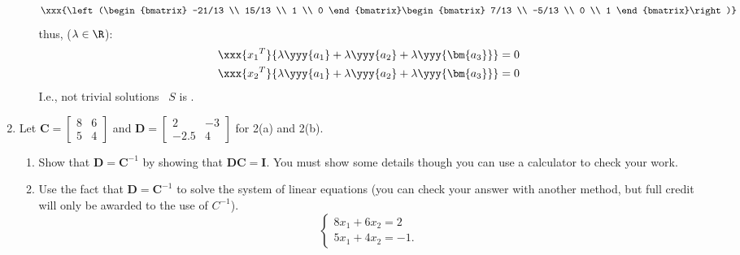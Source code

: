 \documentclass[basic]{inVerba-notes}
\begin{document}
\begin{enumerate}[align=left, leftmargin=0pt, labelindent=\parindent, listparindent=\parindent, labelwidth=0pt, itemindent=!]
\begin{enumerate}
{\begin{itemize}
      \[%
      \xxx{\left(\begin{bmatrix} -21/13 \\ 15/13 \\ 1 \\ 0 \end{bmatrix}\begin{bmatrix} 7/13 \\ -5/13 \\ 0 \\ 1 \end{bmatrix}\right)}
      \]%
      thus, (\(\lambda \in \R\)):
      \begin{align*}
        \xxx{{x_1}^T}\{\lambda\yyy{a_1} + \lambda\yyy{a_2}+ \lambda\yyy{\bm{a_3}} \} = 0 \\
        \xxx{{x_2}^T}\{\lambda\yyy{a_1} + \lambda\yyy{a_2}+ \lambda\yyy{\bm{a_3}} \} = 0 
      \end{align*}
      I.e., not trivial solutions \to~\(S\) is .
    \end{itemize}}
    
  \end{enumerate}

  \newpage

  \item Let \(\bm{C}=\begin{bmatrix}8 & 6\\5 & 4\end{bmatrix}\) and \(\bm{D}=\begin{bmatrix}2 & -3\\-2.5 & 4\end{bmatrix}\) for 2(a) and 2(b).
  
  \begin{enumerate}
    \item {} Show that \(\bm{D}=\bm{C}^{-1}\) by showing that \(\bm{DC}=\bm{I}\). You must show some details though you can use a calculator to check your work.
    
    \newpage
    
    \item {} Use the fact that \(\bm{D}=\bm{C}^{-1}\) to solve the system of linear equations (you can check your answer with another method, but full credit will only be awarded to the use of \(C^{-1}\)).
    \[
    \begin{cases}
    8x_1+6x_2=2 \\
    5x_1+4x_2=-1.
    \end{cases}
    \]
  \end{enumerate}


\end{enumerate}
\end{document}
